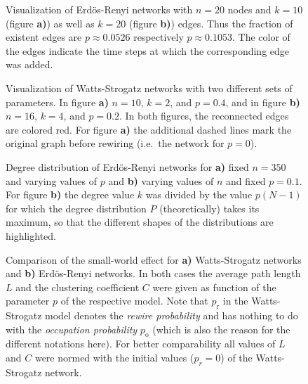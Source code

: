 \documentclass{scrartcl}
\begin{document}
\begin{figure}
    \centering
    \def\svgwidth{0.8\columnwidth}
    
    \caption{Visualization of Erdös-Renyi networks with $n=20$ nodes and $k = 10$ (figure \textbf{a)}) as well as $k = 20$ (figure \textbf{b)}) edges. Thus the fraction of existent edges are $p \approx 0.0526$ respectively $p \approx 0.1053$. The color of the edges indicate the time steps at which the corresponding edge was added.}
    \label{11_er}
\end{figure}

\begin{figure}
    \centering
    \def\svgwidth{0.8\columnwidth}
    
    \caption{Visualization of Watts-Strogatz networks with two different
        sets of parameters. In figure \textbf{a)} $n=10$, $k=2$, and
        $p=0.4$, and in figure \textbf{b)} $n=16$, $k=4$, and $p=0.2$. In
        both figures, the reconnected edges are colored red. For figure
        \textbf{a)} the additional dashed lines mark the original graph
    before rewiring (i.e.\ the network for $p=0$).}
    \label{13_ws}
\end{figure}

\begin{figure}
    \caption{Degree distribution of Erdös-Renyi networks for \textbf{a)}
    fixed $n=350$ and varying values of $p$ and \textbf{b)} varying values
    of $n$ and fixed $p=0.1$. For figure \textbf{b)} the degree value $k$ was
    divided by the value $p(N-1)$ for which the degree distribution $P$
    (theoretically) takes its maximum, so that the different shapes of the
    distributions are highlighted.}
    \label{fig:12_er}
\end{figure}


\begin{figure}
    \caption{Comparison of the small-world effect for \textbf{a)}
    Watts-Strogatz networks and \textbf{b)} Erdös-Renyi networks. In both
    cases the average path length $L$ and the clustering coefficient $C$
    were given as function of the parameter $p$ of the respective model.
    Note that $p_\mathrm{r}$ in the Watts-Strogatz model denotes the
    \emph{rewire probability} and has nothing to do with the
    \emph{occupation probability} $p_\mathrm{o}$ (which is also the reason
    for the different notations here). For better comparability all values
    of $L$ and $C$ were normed with the initial values ($p_r=0$) of the
    Watts-Strogatz network.}
    \label{fig:13_sm_effect}
\end{figure}
\end{document}
